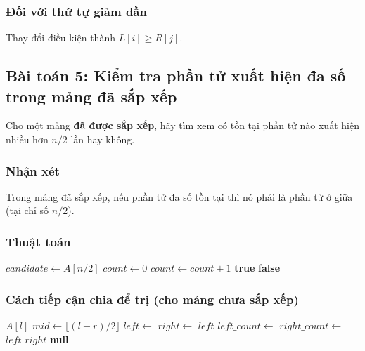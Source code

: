 \documentclass{article}
\begin{document}
\subsubsection{Đối với thứ tự giảm dần}
Thay đổi điều kiện thành \(L[i] \ge R[j]\).

\subsection{Bài toán 5: Kiểm tra phần tử xuất hiện đa số trong mảng đã sắp xếp}

Cho một mảng \textbf{đã được sắp xếp}, hãy tìm xem có tồn tại phần tử nào xuất hiện nhiều hơn \(n/2\) lần hay không.

\subsubsection{Nhận xét}
Trong mảng đã sắp xếp, nếu phần tử đa số tồn tại thì nó phải là phần tử ở giữa (tại chỉ số \(n/2\)).

\subsubsection{Thuật toán}

\begin{algorithmic}[1]
    \State $candidate \gets A[n/2]$
    \State $count \gets 0$
            \State $count \gets count + 1$
        \EndIf
    \EndFor
        \State \Return \textbf{true}
    \Else
        \State \Return \textbf{false}
    \EndIf
\EndFunction
\end{algorithmic}

\subsubsection{Cách tiếp cận chia để trị (cho mảng chưa sắp xếp)}

\begin{algorithmic}[1]
        \State \Return $A[l]$
    \EndIf
    \State $mid \gets \lfloor (l+r)/2 \rfloor$
    \State $left \gets$ 
    \State $right \gets$ 
        \State \Return $left$
    \EndIf
    \State $left\_count \gets$ 
    \State $right\_count \gets$ 
        \State \Return $left$
        \State \Return $right$
    \Else
        \State \Return \textbf{null}
    \EndIf
\EndFunction
\end{algorithmic}
\end{document}
